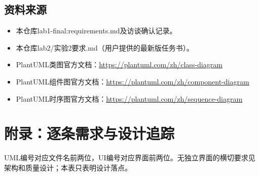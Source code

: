 \documentclass[UTF8,zihao=-4,fontset=windows]{ctexart}
\begin{document}
\subsection{资料来源}
\begin{itemize}
\item 本仓库lab1-final:requirements.md及访谈确认记录。
\item 本仓库lab2/实验2要求.md（用户提供的最新版任务书）。
\item PlantUML类图官方文档：\url{https://plantuml.com/zh/class-diagram}
\item PlantUML组件图官方文档：\url{https://plantuml.com/zh/component-diagram}
\item PlantUML时序图官方文档：\url{https://plantuml.com/zh/sequence-diagram}
\end{itemize}

\clearpage

\section{附录：逐条需求与设计追踪}
UML编号对应文件名前两位，UI编号对应界面前两位。无独立界面的横切要求见架构和质量设计；本表只表明设计落点。
\end{document}
